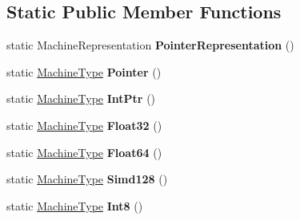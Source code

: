 \subsection*{Static Public Member Functions}
\begin{DoxyCompactItemize}
\item 
static Machine\+Representation {\bfseries Pointer\+Representation} ()\hypertarget{classv8_1_1internal_1_1_machine_type_af47e63779551bee028a1d4272b23958e}{}\label{classv8_1_1internal_1_1_machine_type_af47e63779551bee028a1d4272b23958e}

\item 
static \hyperlink{classv8_1_1internal_1_1_machine_type}{Machine\+Type} {\bfseries Pointer} ()\hypertarget{classv8_1_1internal_1_1_machine_type_ac35bd5045b0dcc7d80f29ddbf9c0927e}{}\label{classv8_1_1internal_1_1_machine_type_ac35bd5045b0dcc7d80f29ddbf9c0927e}

\item 
static \hyperlink{classv8_1_1internal_1_1_machine_type}{Machine\+Type} {\bfseries Int\+Ptr} ()\hypertarget{classv8_1_1internal_1_1_machine_type_a7459a391b619e122644514270a9a64bd}{}\label{classv8_1_1internal_1_1_machine_type_a7459a391b619e122644514270a9a64bd}

\item 
static \hyperlink{classv8_1_1internal_1_1_machine_type}{Machine\+Type} {\bfseries Float32} ()\hypertarget{classv8_1_1internal_1_1_machine_type_a0615c75ba6eff8b8f63b7e44d6c43bb5}{}\label{classv8_1_1internal_1_1_machine_type_a0615c75ba6eff8b8f63b7e44d6c43bb5}

\item 
static \hyperlink{classv8_1_1internal_1_1_machine_type}{Machine\+Type} {\bfseries Float64} ()\hypertarget{classv8_1_1internal_1_1_machine_type_aadf30af3266104c47285d0edde7b2929}{}\label{classv8_1_1internal_1_1_machine_type_aadf30af3266104c47285d0edde7b2929}

\item 
static \hyperlink{classv8_1_1internal_1_1_machine_type}{Machine\+Type} {\bfseries Simd128} ()\hypertarget{classv8_1_1internal_1_1_machine_type_a1207ee7c966dfe42d8eb4b3e5c764f11}{}\label{classv8_1_1internal_1_1_machine_type_a1207ee7c966dfe42d8eb4b3e5c764f11}

\item 
static \hyperlink{classv8_1_1internal_1_1_machine_type}{Machine\+Type} {\bfseries Int8} ()\hypertarget{classv8_1_1internal_1_1_machine_type_a089c45228c7a07095b68d65954c0be33}{}\label{classv8_1_1internal_1_1_machine_type_a089c45228c7a07095b68d65954c0be33}


\end{DoxyCompactItemize}
